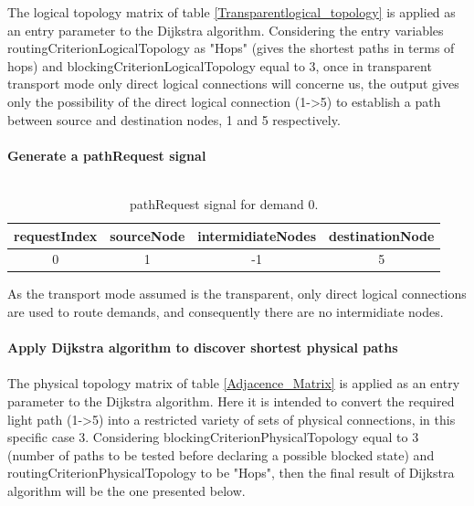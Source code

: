 The logical topology matrix of table \ref{Transparentlogical_topology} is applied as an entry parameter to the Dijkstra algorithm. Considering the entry variables routingCriterionLogicalTopology as "Hops" (gives the shortest paths in terms of hops) and blockingCriterionLogicalTopology equal to 3, once in transparent transport mode only direct logical connections will concerne us, the output gives only the possibility of the direct logical connection (1->5) to establish a path between source and destination nodes, 1 and 5 respectively.\\ \\

\textbf{Generate a pathRequest signal}\\ \\

\begin{table}[H]
	\centering
	\begin{tabular}{|c|c|c|c|}
		\hline
		requestIndex & sourceNode & intermidiateNodes & destinationNode \\ \hline
		0            & 1          & -1                 & 5               \\ \hline
	\end{tabular}
	\caption{pathRequest signal for demand 0.}
\end{table} 

As the transport mode assumed is the transparent, only direct logical connections are used to route demands, and consequently there are no intermidiate nodes.\\ \\

\textbf{Apply Dijkstra algorithm to discover shortest physical paths}\\ \\
The physical topology matrix of table \ref{Adjacence_Matrix} is applied as an entry parameter to the Dijkstra algorithm. Here it is intended to convert the required light path (1->5) into a restricted variety of sets of physical connections, in this specific case 3. Considering blockingCriterionPhysicalTopology equal to 3 (number of paths to be tested before declaring a possible blocked state) and routingCriterionPhysicalTopology to be "Hops", then the final result of Dijkstra algorithm will be the one presented below.



